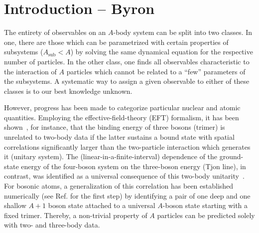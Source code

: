 \documentclass[preprint,12pt]{elsarticle}
\begin{document}
\section{Introduction -- Byron}
The entirety of observables on an $A$-body system can be split into two classes. In one, there are those
which can be parametrized with certain properties of subsystems ($A_\text{sub}<A$) by solving the same
dynamical equation for the respective number of particles. In the other class, one finds all observables
characteristic to the interaction of $A$ particles which cannot be related to a ``few'' parameters of the
subsystems. A systematic way to assign a given observable to either of these classes is to our best knowledge unknown.

However, progress has been made to categorize particular nuclear and atomic quantities. Employing the
effective-field-theory (EFT) formalism, it has been shown~\cite{Bedaque:1998kg}, for instance, that the binding energy 
of three bosons (trimer)
is unrelated to two-body data if the latter sustains a bound state with spatial correlations significantly larger
than the two-particle interaction which generates it (unitary system). The (linear-in-a-finite-interval) dependence
of the ground-state
energy of the four-boson system on the three-boson energy (Tjon line), in contrast, was identified as a
universal consequence of this two-body unitarity~\cite{Platter:2004zs}.
For bosonic atoms, a generalization of this correlation has been
established numerically (see Ref.\cite{von_Stecher_2010} for the first step)
by identifying a pair of one deep and one shallow $A+1$ boson state attached to
a universal $A$-boson state starting with a fixed trimer.
Thereby, a non-trivial property of $A$ particles can
be predicted solely with two- and three-body data.
\end{document}

